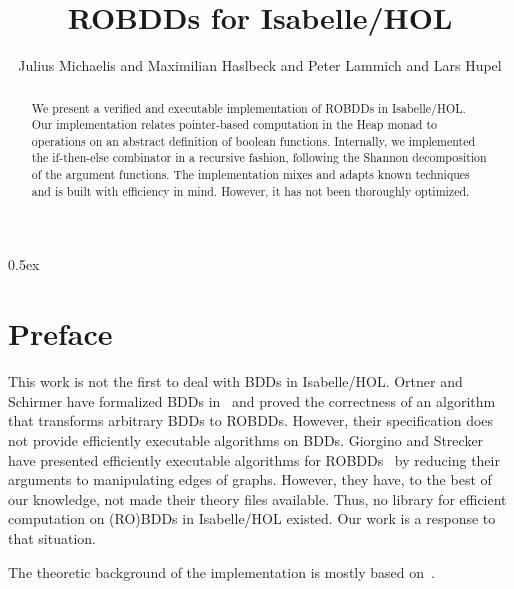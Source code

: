 \documentclass[11pt,a4paper]{article}
\begin{document}
\title{ROBDDs for Isabelle/HOL}
\author{Julius Michaelis and Maximilian Haslbeck and Peter Lammich and Lars Hupel}
\maketitle

\begin{abstract}
	We present a verified and executable implementation of ROBDDs in Isabelle/HOL.
	Our implementation relates pointer-based computation in the Heap monad to operations on an abstract definition of boolean functions.
	Internally, we implemented the if-then-else combinator in a recursive fashion, following the Shannon decomposition of the argument functions.
	The implementation mixes and adapts known techniques and is built with efficiency in mind. However, it has not been thoroughly optimized.
\end{abstract}

\tableofcontents

\parindent 0pt\parskip 0.5ex

\section{Preface}
This work is not the first to deal with BDDs in Isabelle/HOL.
Ortner and Schirmer have formalized BDDs in~\cite{BDD-AFP} and proved the correctness of an algorithm that transforms arbitrary BDDs to ROBDDs.
However, their specification does not provide efficiently executable algorithms on BDDs.
Giorgino and Strecker have presented efficiently executable algorithms for ROBDDs~\cite{giorgino2012correctness} by reducing their arguments to manipulating edges of graphs.
However, they have, to the best of our knowledge, not made their theory files available.
Thus, no library for efficient computation on (RO)BDDs in Isabelle/HOL existed.
Our work is a response to that situation.

The theoretic background of the implementation is mostly based on~\cite{brace1991efficient}.






\end{document}
